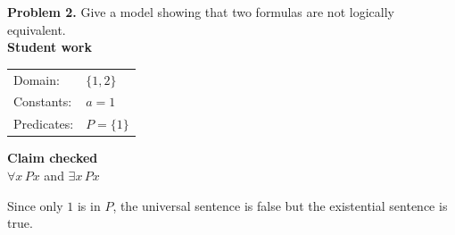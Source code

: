 \documentclass[11pt]{article}
\begin{document}
\noindent\textbf{Problem 2.} Give a model showing that two formulas are not logically equivalent.\\[0.75em]

\noindent\textbf{Student work}\\[0.4em]
\begin{tabular}{@{}ll@{}}
Domain: & $\{1,2\}$ \\
Constants: & $a = 1$ \\
Predicates: & $P = \{1\}$
\end{tabular}

\vspace{1.1em}
\noindent\textbf{Claim checked}\\[0.4em]
$\forall x\,Px$ \hspace{1em} and \hspace{1em} $\exists x\,Px$

\vspace{1.1em}
\noindent Since only $1$ is in $P$, the universal sentence is false but the existential sentence is true.
\end{document}
